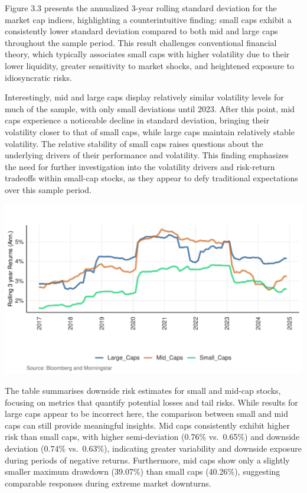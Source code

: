 \documentclass[12pt,preprint]{elsarticle}
\let\origfigure\figure
\let\endorigfigure\endfigure
\renewenvironment{figure}[1][2] {
    \expandafter\origfigure\expandafter[H]
} {
    \endorigfigure
}
\numberwithin{equation}{section}
\numberwithin{figure}{section}
\numberwithin{table}{section}
\begin{document}
Figure 3.3 presents the annualized 3-year rolling standard deviation for
the market cap indices, highlighting a counterintuitive finding: small
caps exhibit a consistently lower standard deviation compared to both
mid and large caps throughout the sample period. This result challenges
conventional financial theory, which typically associates small caps
with higher volatility due to their lower liquidity, greater sensitivity
to market shocks, and heightened exposure to idiosyncratic risks.

Interestingly, mid and large caps display relatively similar volatility
levels for much of the sample, with only small deviations until 2023.
After this point, mid caps experience a noticeable decline in standard
deviation, bringing their volatility closer to that of small caps, while
large caps maintain relatively stable volatility. The relative stability
of small caps raises questions about the underlying drivers of their
performance and volatility. This finding emphasizes the need for further
investigation into the volatility drivers and risk-return tradeoffs
within small-cap stocks, as they appear to defy traditional expectations
over this sample period.

\begin{figure}[H]

{\centering \includegraphics{plots/sd_plot} 

}

\caption{Annualized 3-year Rolling SD By Market Cap Size \label{Figure3}}\label{fig:Figure3}
\end{figure}

The table summarises downside risk estimates for small and mid-cap
stocks, focusing on metrics that quantify potential losses and tail
risks. While results for large caps appear to be incorrect here, the
comparison between small and mid caps can still provide meaningful
insights. Mid caps consistently exhibit higher risk than small caps,
with higher semi-deviation (0.76\% vs.~0.65\%) and downside deviation
(0.74\% vs.~0.63\%), indicating greater variability and downside
exposure during periods of negative returns. Furthermore, mid caps show
only a slightly smaller maximum drawdown (39.07\%) than small caps
(40.26\%), suggesting comparable responses during extreme market
downturns.
\end{document}
